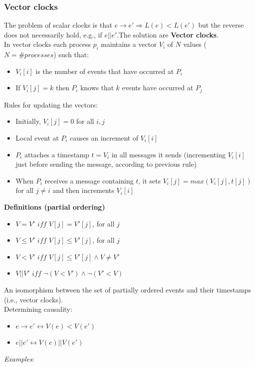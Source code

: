 \documentclass[10pt,a4paper]{article}
\begin{document}
\subsubsection{Vector clocks}
The problem of scalar clocks is that $e \rightarrow e' \Rightarrow L(e) < L(e')$ but the reverse does not necessarily hold, e.g., if $e || e'$.The solution are \textbf{Vector clocks}.\\ In vector clocks each process $p_i$ maintains a vector $V_i$ of $N$ values ($N=\#processes$) such that:
\begin{itemize}
	\item $V_i[i]$ is the number of events that have occurred at $P_i$
	\item If $V_i[j]=k$ then $P_i$ knows that $k$ events have occurred at $P_j$
\end{itemize}
Rules for updating the vectors:
\begin{itemize}
	\item Initially, $V_i[j]=0$ for all $i,j$
	\item Local event at $P_i$ causes an increment of $V_i[i]$
	\item $P_i$ attaches a timestamp $t=V_i$ in all messages it sends (incrementing $V_i[i]$ just before sending the message, according to previous rule)
	\item When $P_i$ receives a message containing $t$, it sets $V_i[j]=max(V_i[j],t[j])$ for all $j \neq i$ and then increments $V_i[i]$
\end{itemize}
\textbf{Definitions (partial ordering)}
\begin{itemize}
	\item $V=V'$ $iff$ $V[j]=V'[j]$, for all $j$
	\item $V \leq V'$ $iff$ $V[j] \leq V'[j]$, for all $j$
	\item $V < V'$ $iff$ $V[j] \leq V'[j] \wedge V \neq V'$
	\item $V || V'$ $iff$ $\neg(V<V') \wedge \neg(V'<V)$
\end{itemize}
An isomorphism between the set of partially ordered events and their timestamps (i.e., vector clocks). \\ 
Determining causality:
\begin{itemize}
	\item $e \rightarrow e' \leftrightarrow V(e) < V(e')$
	\item $e || e' \leftrightarrow V(e) || V(e')$
\end{itemize}
\textit{Examples}:
\end{document}
